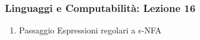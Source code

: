 




\begin{frame}[fragile]
	\frametitle{Linguaggi e Computabilità: Lezione 16}
\begin{enumerate}
\item
Passaggio Espressioni regolari a $\epsilon$-NFA
\end{enumerate}
\end{frame}



